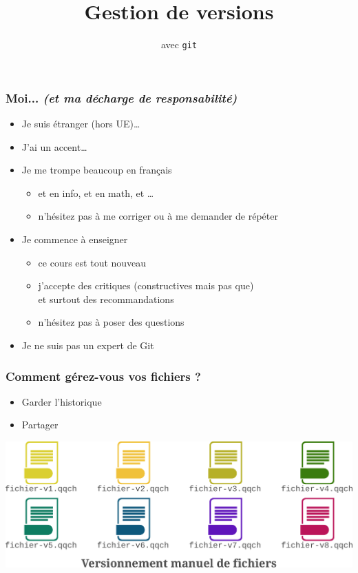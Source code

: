 \documentclass[table,tikz,12pt,svgnames]{beamer}
\title{\LARGE Gestion de versions}
\subtitle{avec \texttt{git}}
\date{}
\begin{document}
\begin{frame}
	\titlepage
\end{frame}

\ifANIMATE
\begin{frame}[noframenumbering]
	\frametitle{Moi... \textit{\small (et ma décharge de responsabilité)}}
	\begin{itemize}
		\item Je suis étranger (hors UE)…
		\item J'ai un accent…
		\item Je me {\color{title} trompe beaucoup} en français
		\begin{itemize}
			\item et en info, et en math, et \ldots
			\item n'hésitez pas à me corriger ou à me demander de répéter
		\end{itemize}
		\item Je commence à enseigner
		\begin{itemize}
			\item ce cours est tout nouveau
			\item j'accepte des critiques (constructives mais pas que)\\
			et surtout des recommandations
			\item n'hésitez pas à poser des questions
		\end{itemize}
		\item Je ne suis pas un expert de Git
	\end{itemize}
\end{frame}
\fi

\begin{frame}
	\frametitle{Comment gérez-vous vos fichiers ?}
	\vspace{-1em}
	\begin{block}{}
	\begin{itemize}
		\item Garder l'historique
		\item Partager
	\end{itemize}
	\end{block}
	\vspace{-2em}
	\PAUSE
	\begin{block}{}
    \begin{adjustwidth}{-0.5cm}{-0.5cm}{}
		\begin{center}	
		{\includegraphics[scale=0.5]{images/file_versions.pdf}}
		\end{center}
	\end{adjustwidth}
	\end{block}
\end{frame}
\end{document}
